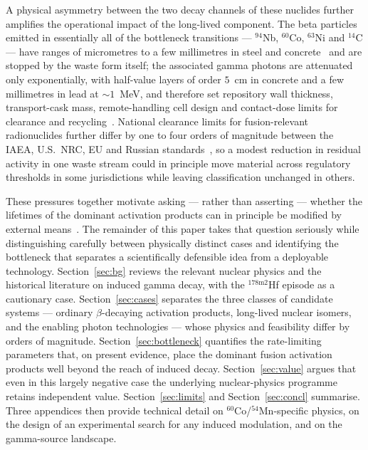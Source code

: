 \documentclass[conference]{IEEEtran}
\begin{document}
A physical asymmetry between the two decay channels of these nuclides further amplifies the operational impact of the long-lived component. The beta particles emitted in essentially all of the bottleneck transitions --- $^{94}$Nb, $^{60}$Co, $^{63}$Ni and $^{14}$C --- have ranges of micrometres to a few millimetres in steel and concrete~\cite{krane1988} and are stopped by the waste form itself; the associated gamma photons are attenuated only exponentially, with half-value layers of order $5$~cm in concrete and a few millimetres in lead at $\sim 1$~MeV, and therefore set repository wall thickness, transport-cask mass, remote-handling cell design and contact-dose limits for clearance and recycling~\cite{krane1988,dipace2012radwaste}. National clearance limits for fusion-relevant radionuclides further differ by one to four orders of magnitude between the IAEA, U.S.\ NRC, EU and Russian standards~\cite{zucchetti2004regulations,dipace2012radwaste}, so a modest reduction in residual activity in one waste stream could in principle move material across regulatory thresholds in some jurisdictions while leaving classification unchanged in others.

These pressures together motivate asking --- rather than asserting --- whether the lifetimes of the dominant activation products can in principle be modified by external means~\cite{walker1999nature,karpeshin2006induced}. The remainder of this paper takes that question seriously while distinguishing carefully between physically distinct cases and identifying the bottleneck that separates a scientifically defensible idea from a deployable technology. Section~\ref{sec:bg} reviews the relevant nuclear physics and the historical literature on induced gamma decay, with the $^{178\mathrm{m}2}$Hf episode as a cautionary case. Section~\ref{sec:cases} separates the three classes of candidate systems --- ordinary $\beta$-decaying activation products, long-lived nuclear isomers, and the enabling photon technologies --- whose physics and feasibility differ by orders of magnitude. Section~\ref{sec:bottleneck} quantifies the rate-limiting parameters that, on present evidence, place the dominant fusion activation products well beyond the reach of induced decay. Section~\ref{sec:value} argues that even in this largely negative case the underlying nuclear-physics programme retains independent value. Section~\ref{sec:limits} and Section~\ref{sec:concl} summarise. Three appendices then provide technical detail on $^{60}$Co/$^{54}$Mn-specific physics, on the design of an experimental search for any induced modulation, and on the gamma-source landscape.
\end{document}
